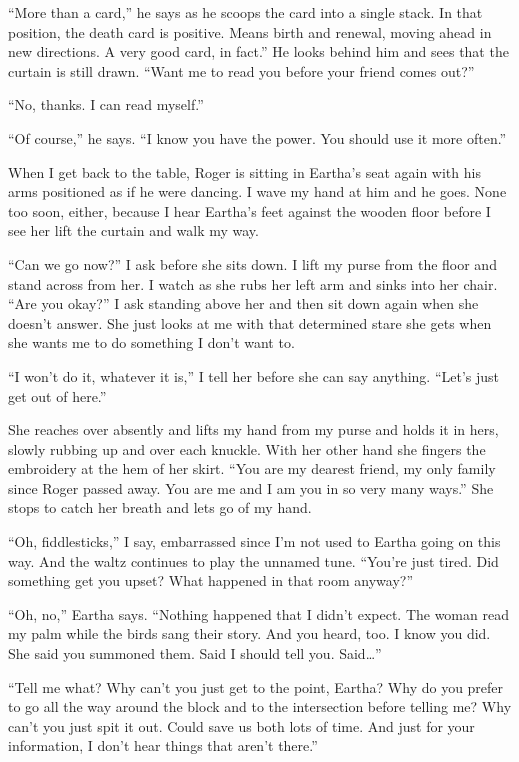 \documentclass[
]{article}
\begin{document}
``More than a card,'' he says as he scoops the card into a single stack.
In that position, the death card is positive. Means birth and renewal,
moving ahead in new directions. A very good card, in fact.'' He looks
behind him and sees that the curtain is still drawn. ``Want me to read
you before your friend comes out?''

``No, thanks. I can read myself.''

``Of course,'' he says. ``I know you have the power. You should use it
more often.''

When I get back to the table, Roger is sitting in Eartha's seat again
with his arms positioned as if he were dancing. I wave my hand at him
and he goes. None too soon, either, because I hear Eartha's feet against
the wooden floor before I see her lift the curtain and walk my way.

``Can we go now?'' I ask before she sits down. I lift my purse from the
floor and stand across from her. I watch as she rubs her left arm and
sinks into her chair. ``Are you okay?'' I ask standing above her and
then sit down again when she doesn't answer. She just looks at me with
that determined stare she gets when she wants me to do something I don't
want to.

``I won't do it, whatever it is,'' I tell her before she can say
anything. ``Let's just get out of here.''

She reaches over absently and lifts my hand from my purse and holds it
in hers, slowly rubbing up and over each knuckle. With her other hand
she fingers the embroidery at the hem of her skirt. ``You are my dearest
friend, my only family since Roger passed away. You are me and I am you
in so very many ways.'' She stops to catch her breath and lets go of my
hand.

``Oh, fiddlesticks,'' I say, embarrassed since I'm not used to Eartha
going on this way. And the waltz continues to play the unnamed tune.
``You're just tired. Did something get you upset? What happened in that
room anyway?''

``Oh, no,'' Eartha says. ``Nothing happened that I didn't expect. The
woman read my palm while the birds sang their story. And you heard, too.
I know you did. She said you summoned them. Said I should tell you.
Said\ldots''

``Tell me what? Why can't you just get to the point, Eartha? Why do you
prefer to go all the way around the block and to the intersection before
telling me? Why can't you just spit it out. Could save us both lots of
time. And just for your information, I don't hear things that aren't
there.''
\end{document}
